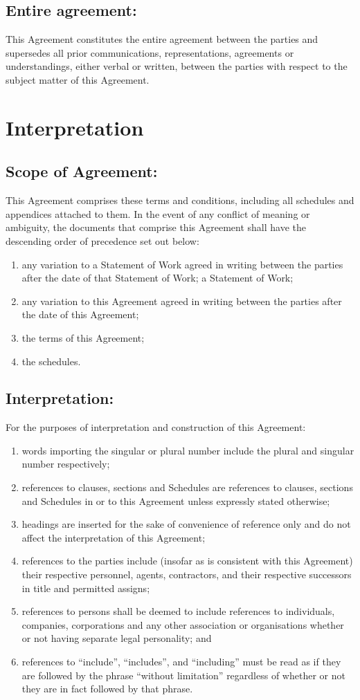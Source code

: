 \documentclass[a4paper,12pt]{article}
\begin{document}
\subsection{Entire agreement:}  This Agreement constitutes the entire agreement between the parties and supersedes all prior communications, representations, agreements or understandings, either verbal or written, between the parties with respect to the subject matter of this Agreement.
\section{Interpretation}
\subsection{Scope of Agreement:}  This Agreement comprises these terms and conditions, including all schedules and appendices attached to them.  In the event of any conflict of meaning or ambiguity, the documents that comprise this Agreement shall have the descending order of precedence set out below:
\begin{enumerate}
\item any variation to a Statement of Work agreed in writing between the parties after the date of that Statement of Work;
a Statement of Work;
\item any variation to this Agreement agreed in writing between the parties after the date of this Agreement;
\item the terms of this Agreement;
\item the schedules.
\end{enumerate}
\subsection{Interpretation:}  For the purposes of interpretation and construction of this Agreement:
\begin{enumerate}
\item words importing the singular or plural number include the plural and singular number respectively;
\item references to clauses, sections and Schedules are references to clauses, sections and Schedules in or to this Agreement unless expressly stated otherwise;
\item headings are inserted for the sake of convenience of reference only and do not affect the interpretation of this Agreement;
\item references to the parties include (insofar as is consistent with this Agreement) their respective personnel, agents, contractors, and their respective successors in title and permitted assigns;
\item references to persons shall be deemed to include references to individuals, companies, corporations and any other association or organisations whether or not having separate legal personality; and
\item references to “include”, “includes”, and “including” must be read as if they are followed by the phrase “without limitation” regardless of whether or not they are in fact followed by that phrase.
\end{enumerate}
\end{document}
